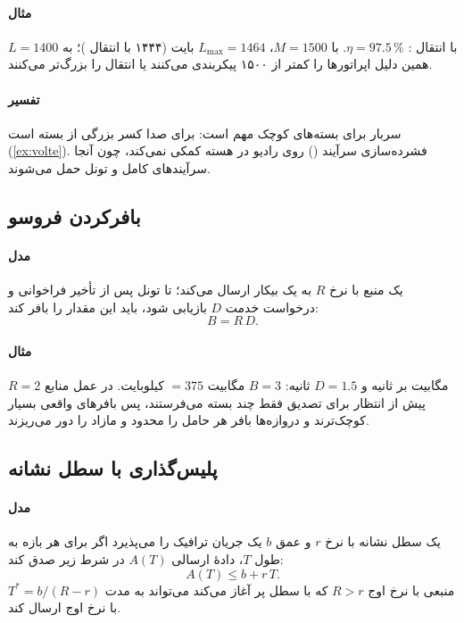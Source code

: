 \documentclass[11pt,a4paper]{article}
\begin{document}
\paragraph{مثال} $L = 1400$ با انتقال : $\eta = 97.5\,\%$. با $M = 1500$، $L_{\max} = 1464$ بایت (۱۴۴۴ با انتقال
)؛ به همین دلیل اپراتورها   را کمتر از ۱۵۰۰ پیکربندی می‌کنند یا  انتقال را بزرگ‌تر
می‌کنند.
\paragraph{تفسیر} سربار برای بسته‌های کوچک مهم است: برای صدا کسر بزرگی از بسته است (\cref{ex:volte}). فشرده‌سازی سرآیند
() روی رادیو در هسته کمکی نمی‌کند، چون آنجا سرآیندهای کامل و تونل حمل می‌شوند.

\subsection{بافرکردن فروسو}\label{sec:buffer}
\paragraph{مدل} یک منبع با نرخ $R$ به یک  بیکار ارسال می‌کند؛ تا تونل  پس از تأخیر فراخوانی و درخواست
خدمت $D$ بازیابی شود،  باید این مقدار را بافر کند:
\begin{equation}\label{eq:buffer}
  B = R\,D .
\end{equation}
\paragraph{مثال} $R = 2$ مگابیت بر ثانیه و $D = 1.5$ ثانیه: $B = 3$ مگابیت $= 375$ کیلوبایت. در عمل منابع  پیش از
انتظار برای تصدیق فقط چند بسته می‌فرستند، پس بافرهای واقعی بسیار کوچک‌ترند و دروازه‌ها بافر هر حامل را محدود و مازاد را
دور می‌ریزند.

\subsection{پلیس‌گذاری با سطل نشانه}\label{sec:tb}
\paragraph{مدل} یک سطل نشانه با نرخ $r$ و عمق $b$ یک جریان ترافیک را می‌پذیرد اگر برای هر بازه به طول $T$، دادهٔ ارسالی
$A(T)$ در شرط زیر صدق کند:
\begin{equation}\label{eq:tb}
  A(T) \le b + r\,T .
\end{equation}
منبعی با نرخ اوج $R > r$ که با سطل پر آغاز می‌کند می‌تواند به مدت $T^\ast = b/(R-r)$ با نرخ اوج ارسال کند.
\end{document}
